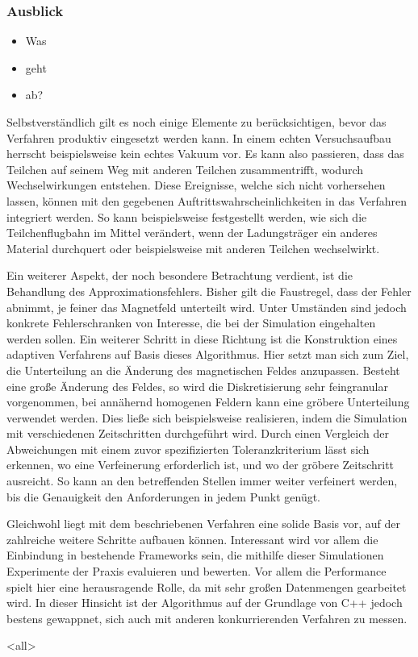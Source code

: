 \mode*
\begin{frame}
  \frametitle{Ausblick}
  \begin{itemize}
    \item Was
    \item geht
    \item ab?
  \end{itemize}
\end{frame}


Selbstverst\"andlich gilt es noch einige Elemente zu ber\"ucksichtigen, bevor das Verfahren produktiv eingesetzt werden kann.
In einem echten Versuchsaufbau herrscht beispielsweise kein echtes Vakuum vor. Es kann also passieren, dass das Teilchen auf seinem
Weg mit anderen Teilchen zusammentrifft, wodurch Wechselwirkungen entstehen. Diese Ereignisse, welche
sich nicht vorhersehen lassen, k\"onnen mit den gegebenen Auftrittswahrscheinlichkeiten in das Verfahren integriert werden. So kann beispielsweise festgestellt werden, wie sich die Teilchenflugbahn im Mittel ver\"andert,
wenn der Ladungstr\"ager ein anderes Material durchquert oder beispielsweise mit anderen Teilchen wechselwirkt.

Ein weiterer Aspekt, der noch besondere Betrachtung verdient, ist die Behandlung des Approximationsfehlers. Bisher gilt die Faustregel, dass
der Fehler abnimmt, je feiner das Magnetfeld unterteilt wird. Unter Umst\"anden sind jedoch konkrete Fehlerschranken von Interesse, die bei der
Simulation eingehalten werden sollen. Ein weiterer Schritt in diese Richtung ist die Konstruktion eines adaptiven Verfahrens auf Basis dieses Algorithmus.
Hier setzt man sich zum Ziel, die Unterteilung an die \"Anderung des magnetischen Feldes anzupassen. Besteht eine
gro{\ss}e \"Anderung des Feldes, so wird die Diskretisierung sehr feingranular vorgenommen, bei ann\"ahernd homogenen Feldern kann
eine gr\"obere Unterteilung verwendet werden. Dies lie{\ss}e sich beispielsweise realisieren, indem die Simulation mit
verschiedenen Zeitschritten durchgef\"uhrt wird. Durch einen Vergleich der Abweichungen mit einem zuvor spezifizierten
Toleranzkriterium l\"asst sich erkennen, wo eine Verfeinerung erforderlich ist, und wo der gr\"obere Zeitschritt ausreicht.
So kann an den betreffenden Stellen immer weiter verfeinert werden, bis die Genauigkeit den Anforderungen in jedem Punkt gen\"ugt.

Gleichwohl liegt mit dem beschriebenen Verfahren eine solide Basis vor, auf der zahlreiche weitere Schritte aufbauen k\"onnen. Interessant
wird vor allem die Einbindung in bestehende Frameworks sein, die mithilfe dieser Simulationen Experimente der Praxis evaluieren und bewerten.
Vor allem die Performance spielt hier eine herausragende Rolle, da mit sehr gro{\ss}en Datenmengen gearbeitet wird. In dieser Hinsicht ist der
Algorithmus auf der Grundlage von C++ jedoch bestens gewappnet, sich auch  mit anderen konkurrierenden Verfahren zu messen.

\mode<all>
